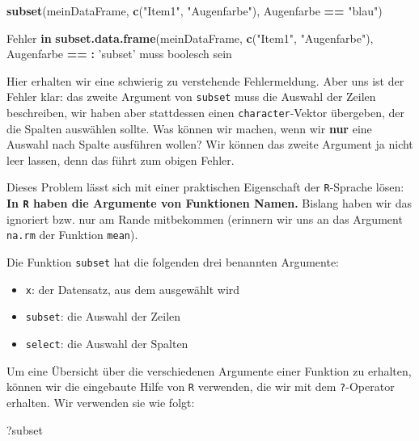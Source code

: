\documentclass[12pt,]{tufte-book}
\newenvironment{Shaded}{\begin{snugshade}}{\end{snugshade}}
\newcommand{\KeywordTok}[1]{\textcolor[rgb]{0.13,0.29,0.53}{\textbf{#1}}}
\newcommand{\StringTok}[1]{\textcolor[rgb]{0.31,0.60,0.02}{#1}}
\newcommand{\ControlFlowTok}[1]{\textcolor[rgb]{0.13,0.29,0.53}{\textbf{#1}}}
\newcommand{\OperatorTok}[1]{\textcolor[rgb]{0.81,0.36,0.00}{\textbf{#1}}}
\newcommand{\ErrorTok}[1]{\textcolor[rgb]{0.64,0.00,0.00}{\textbf{#1}}}
\newcommand{\NormalTok}[1]{#1}
\providecommand{\tightlist}{%
  \setlength{\itemsep}{0pt}\setlength{\parskip}{0pt}}
\theoremstyle{definition}
\theoremstyle{definition}
\theoremstyle{definition}
\theoremstyle{remark}
\begin{document}
\begin{Shaded}
\begin{Highlighting}[]
\KeywordTok{subset}\NormalTok{(meinDataFrame, }\KeywordTok{c}\NormalTok{(}\StringTok{"Item1"}\NormalTok{, }\StringTok{"Augenfarbe"}\NormalTok{),}
\NormalTok{       Augenfarbe }\OperatorTok{==}\StringTok{ "blau"}\NormalTok{)}

\NormalTok{Fehler }\ControlFlowTok{in} \KeywordTok{subset.data.frame}\NormalTok{(meinDataFrame,}
\KeywordTok{c}\NormalTok{(}\StringTok{"Item1"}\NormalTok{, }\StringTok{"Augenfarbe"}\NormalTok{), Augenfarbe }\OperatorTok{==}\StringTok{  }\ErrorTok{:}\StringTok{ 'subset'}\NormalTok{ muss }
\NormalTok{boolesch sein}
\end{Highlighting}
\end{Shaded}

Hier erhalten wir eine schwierig zu verstehende Fehlermeldung. Aber uns
ist der Fehler klar: das zweite Argument von \texttt{subset} muss die
Auswahl der Zeilen beschreiben, wir haben aber stattdessen einen
\texttt{character}-Vektor übergeben, der die Spalten auswählen sollte.
Was können wir machen, wenn wir \textbf{nur} eine Auswahl nach Spalte
ausführen wollen? Wir können das zweite Argument ja nicht leer lassen,
denn das führt zum obigen Fehler.

Dieses Problem lässt sich mit einer praktischen Eigenschaft der
\texttt{R}-Sprache lösen: \textbf{In \texttt{R} haben die Argumente von
Funktionen Namen.} Bislang haben wir das ignoriert bzw. nur am Rande
mitbekommen (erinnern wir uns an das Argument \texttt{na.rm} der
Funktion \texttt{mean}).

Die Funktion \texttt{subset} hat die folgenden drei benannten Argumente:

\begin{itemize}
\tightlist
\item
  \texttt{x}: der Datensatz, aus dem ausgewählt wird
\item
  \texttt{subset}: die Auswahl der Zeilen
\item
  \texttt{select}: die Auswahl der Spalten
\end{itemize}

Um eine Übersicht über die verschiedenen Argumente einer Funktion zu
erhalten, können wir die eingebaute Hilfe von \texttt{R} verwenden, die
wir mit dem \texttt{?}-Operator erhalten. Wir verwenden sie wie folgt:

\begin{Shaded}
\begin{Highlighting}[]
\NormalTok{?subset}
\end{Highlighting}
\end{Shaded}
\end{document}
